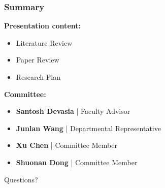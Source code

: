 
\begin{frame}
    \frametitle{Summary}
    \textbf{Presentation content:}
    \begin{itemize}
        \item Literature Review
        \item Paper Review
        \item Research Plan
    \end{itemize}

    \vspace{1cm}
    \textbf{Committee:}
    \begin{itemize}
        \item \textbf{Santosh Devasia} | Faculty Advisor
        \item \textbf{Junlan Wang} | Departmental Representative
        \item \textbf{Xu Chen} | Committee Member
        \item \textbf{Shuonan Dong} | Committee Member
    \end{itemize}

    \vspace{1cm}
    \centering
    \Huge{Questions?}
\end{frame}
